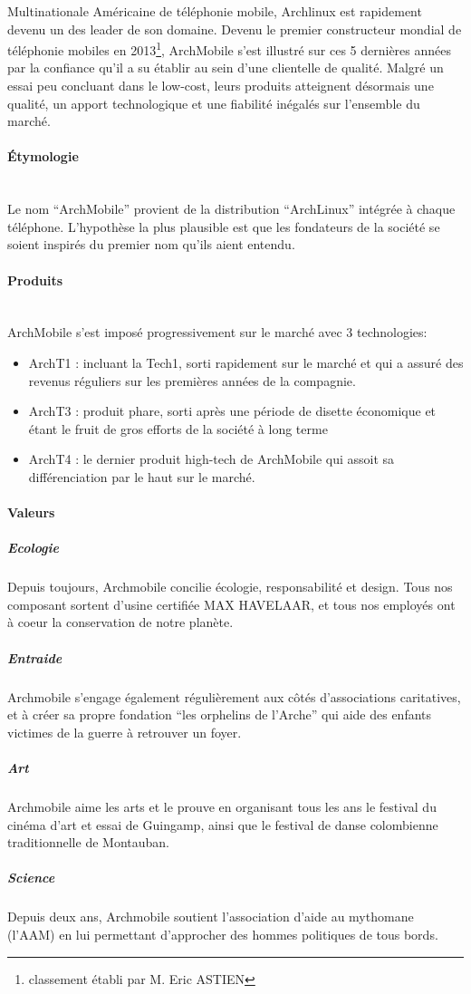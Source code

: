 Multinationale Américaine de téléphonie mobile, Archlinux 
est rapidement devenu un des leader de son domaine.
Devenu le premier constructeur mondial de téléphonie mobiles 
en 2013\footnote{classement établi par M. Eric ASTIEN},
ArchMobile s'est illustré sur ces 5 dernières années par
la confiance qu'il a su établir au sein d'une clientelle 
de qualité. Malgré un essai peu concluant dans le low-cost,
leurs produits atteignent désormais une qualité, un apport
technologique et une fiabilité inégalés sur l'ensemble du
marché.



\paragraph{\'Etymologie}~\\
Le nom ``ArchMobile'' provient de la distribution ``ArchLinux''
intégrée à  chaque téléphone. L'hypothèse la plus plausible
est que les fondateurs de la société se soient inspirés du premier
nom qu'ils aient entendu.

\paragraph{Produits}~\\
ArchMobile s'est imposé progressivement sur le marché avec 3 technologies:
\begin{itemize}
\item ArchT1 : incluant la Tech1, sorti rapidement sur le marché et qui a assuré 
  des revenus réguliers sur les premières années de la compagnie.
\item ArchT3 : produit phare, sorti après une période de disette 
  économique et étant le fruit de gros efforts de la société à long terme
\item ArchT4 : le dernier produit high-tech de ArchMobile qui assoit
  sa différenciation par le haut sur le marché.
\end{itemize}

\paragraph{Valeurs}
\subparagraph{Ecologie}
Depuis toujours, Archmobile concilie écologie, responsabilité et
design. Tous nos composant sortent d'usine certifiée MAX HAVELAAR, et
tous nos employés ont à coeur la conservation de notre planète.
\subparagraph{Entraide}
Archmobile s'engage également régulièrement aux côtés d'associations
caritatives, et à créer sa propre fondation ``les orphelins de
l'Arche'' qui aide des enfants victimes de la guerre à retrouver un
foyer.
\subparagraph{Art}
Archmobile aime les arts et le prouve en organisant tous les ans le
festival du cinéma d'art et essai de Guingamp, ainsi que le festival
de danse colombienne traditionnelle de Montauban.
\subparagraph{Science}
Depuis deux ans, Archmobile soutient l'association d'aide au mythomane
(l'AAM) en lui permettant d'approcher des hommes politiques de tous
bords.
